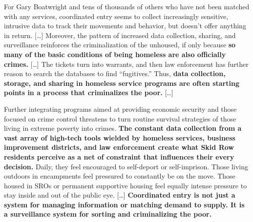 \begin{leftbar}
For Gary Boatwright and tens of thousands of others who have not been
matched with any services, coordinated entry seems to collect
increasingly sensitive, intrusive data to track their movements and
behavior, but doesn't offer anything in return. {[}\ldots{]} Moreover,
the pattern of increased data collection, sharing, and surveillance
reinforces the criminalization of the unhoused, if only because
\textbf{so many of the basic conditions of being homeless are also
officially crimes.} {[}\ldots{]} The tickets turn into warrants, and
then law enforcement has further reason to search the databases to find
``fugitives.'' Thus, \textbf{data collection, storage, and sharing in
homeless service programs are often starting points in a process that
criminalizes the poor.} {[}\ldots{]}

Further integrating programs aimed at providing economic security and
those focused on crime control threatens to turn routine survival
strategies of those living in extreme poverty into crimes. \textbf{The
constant data collection from a vast array of high-tech tools wielded by
homeless services, business improvement districts, and law enforcement
create what Skid Row residents perceive as a net of constraint that
influences their every decision.} Daily, they feel encouraged to
self-deport or self-imprison. Those living outdoors in encampments feel
pressured to constantly be on the move. Those housed in SROs or
permanent supportive housing feel equally intense pressure to stay
inside and out of the public eye. {[}\ldots{]} \textbf{Coordinated entry
is not just a system for managing information or matching demand to
supply. It is a surveillance system for sorting and criminalizing the
poor.} \cite{eubanksAutomatingInequalityHow2019} 
\end{leftbar}

